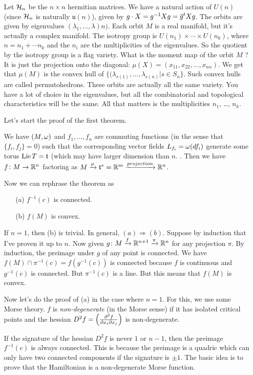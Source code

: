 Let $\mathcal{H}_n$ be the $n\times n$ hermitian matrices. We have a natural action of $U(n)$ (since $\mathcal{H}_n$ is naturally $\mathfrak u(n)$), given by $g\cdot X = g^{-1}Xg = \bbar g^t Xg$. The orbits are given by eigenvalues $(\lambda_1,\dots, \lambda)n)$. Each orbit $M$ is a real manifold, but it's actually a complex manifold. The isotropy group is $U(n_1)\times\cdots \times U(n_k)$, where $n=n_1+\cdots n_k$ and the $n_i$ are the multiplicities of the eigenvalues. So the quotient by the isotropy group is a flag variety. What is the moment map of the orbit $M$ ? It is just the projection onto the diagonal: $\mu(X)=(x_{11},x_{22},\dots, x_{nn})$. We get that $\mu(M)$ is the convex hull of $\{(\lambda_{s(1)},\dots, \lambda_{s(n)}|s\in S_n\}$. Such convex hulls are called permutohedrons. These orbits are actually all the same variety. You have a lot of choice in the eigenvalues, but all the combinatorial and topological characteristics will be the same. All that matters is the multiplicities $n_1$, \dots, $n_k$.

Let's start the proof of the first theorem.

We have $(M,\omega)$ and $f_1,\dots, f_n$ are commuting functions (in the sense that $\{f_i,f_j\}=0$) such that the corresponding vector fields $L_{f_i}=\omega(df_i)$ generate some torus $\operatorname{Lie} T=\mathfrak{t}$ (which may have larger dimension than $n$. . Then we have $f\colon M\to \mathbb{R}^n$ factoring as $M\xrightarrow{\mu}\mathfrak{t}^*=\mathbb{R}^m\xrightarrow{projection}\mathbb{R}^n$. 
 
Now we can rephrase the theorem as
\begin{enumerate}
 \item[(a)] $f^{-1}(c)$ is connected.
 \item[(b)] $f(M)$ is convex.
\end{enumerate}
If $n=1$, then (b) is trivial. In general, $(a)\Rightarrow (b)$. Suppose by induction that I've proven it up to $n$. Now given $g\colon M\xrightarrow f \mathbb{R}^{n+1}\xrightarrow \pi \mathbb{R}^n$ for any projection $\pi$. By induction, the preimage under $g$ of any point is connected. We have $f(M)\cap \pi^{-1}(c)=f(g^{-1}(c))$ is connected because $f$ is continuous and $g^{-1}(c)$ is connected. But $\pi^{-1}(c)$ is a line. But this means that $f(M)$ is convex.

Now let's do the proof of (a) in the case where $n=1$. For this, we use some Morse theory. $f$ is \emph{non-degenerate} (in the Morse sense) if it has isolated critical points and the hessian $D^2f = \Bigl(\frac{\partial ^2f}{\partial x_i\partial x_j}\Bigr)$ is non-degenerate.

If the signature of the hessian $D^2 f$ is never $1$ or $n-1$, then the preimage $f^{-1}(c)$ is always connected. This is because the preimage is a quadric which can only have two connected components if the signature is $\pm 1$. The basic idea is to prove that the Hamiltonian is a non-degenerate Morse function.